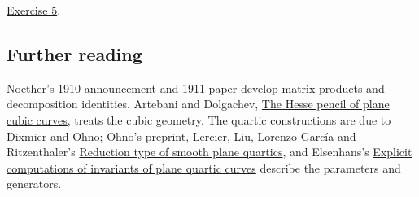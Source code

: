 \documentclass[
]{article}
\begin{document}
\hyperref[exercise-5]{Exercise 5}.

\subsection{Further reading}\label{further-reading}

Noether's 1910 announcement and 1911 paper develop matrix products and
decomposition identities. Artebani and Dolgachev,
\href{https://arxiv.org/abs/math/0611590}{The Hesse pencil of plane
cubic curves}, treats the cubic geometry. The quartic constructions are
due to Dixmier and Ohno; Ohno's
\href{https://aeb.win.tue.nl/math/ohno-preprint.2007.05.15.pdf}{preprint},
Lercier, Liu, Lorenzo García and Ritzenthaler's
\href{https://arxiv.org/abs/1803.05816}{Reduction type of smooth plane
quartics}, and Elsenhans's
\href{https://math.uni-paderborn.de/fileadmin-eim/mathematik/AG-Computeralgebra/Publications-elsenhans/inv_pl_quart_5a.pdf}{Explicit
computations of invariants of plane quartic curves} describe the
parameters and generators.
\end{document}
